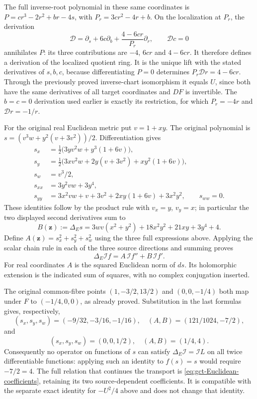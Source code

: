 The full inverse-root polynomial in these same coordinates is
$P=cr^3-2r^2+br-4s$, with $P_r=3cr^2-4r+b$.
On the localization at $P_r$, the derivation
\[
 \mathcal D=\partial_s+6c\partial_b+
                 \frac{4-6cr}{P_r}\partial_r,\qquad \mathcal D c=0
\]
annihilates $P$: its three contributions are $-4$, $6cr$ and
$4-6cr$. It therefore defines a derivation of the localized quotient
ring. It is the unique lift with the stated derivatives of $s,b,c$,
because differentiating $P=0$ determines $P_r\mathcal D r=4-6cr$.
Through the previously proved inverse-chart isomorphism it equals
$U$, since both have the same derivatives of all target coordinates
and $DF$ is invertible. The $b=c=0$ derivation used earlier is
exactly its restriction, for which $P_r=-4r$ and
$\mathcal D r=-1/r$.

For the original real Euclidean metric put $v=1+xy$. The original
polynomial is $s=(v^3w+y^2(v+3v^2))/2$. Differentiation gives
\begin{align*}
 s_x&=\tfrac12\bigl(3yv^2w+y^3(1+6v)\bigr),\\
 s_y&=\tfrac12\bigl(3xv^2w+2y(v+3v^2)+xy^2(1+6v)\bigr),\\
 s_w&=v^3/2,\\
 s_{xx}&=3y^2vw+3y^4,\\
 s_{yy}&=3x^2vw+v+3v^2+2xy(1+6v)+3x^2y^2,
 \qquad s_{ww}=0.
\end{align*}
These identities follow by the product rule with $v_x=y$, $v_y=x$;
in particular the two displayed second derivatives sum to
\[
 B(\mathbf z):=\Delta_Es
 =3wv(x^2+y^2)+18x^2y^2+21xy+3y^4+4.
\]
Define $A(\mathbf z)=s_x^2+s_y^2+s_w^2$ using the three full
expressions above. Applying the scalar chain rule in each of the
three source directions and summing proves
\begin{equation}\label{eq:gct-Euclidean-coefficients}
 \Delta_E\mathcal I f=A\,\mathcal I f''+B\,\mathcal I f'.
\end{equation}
For real coordinates $A$ is the squared Euclidean norm of $ds$.
Its holomorphic extension is the indicated sum of squares, with no
complex conjugation inserted.

The original common-fibre points
$(1,-3/2,13/2)$ and $(0,0,-1/4)$ both map under $F$ to
$(-1/4,0,0)$, as already proved. Substitution in the last formulas
gives, respectively,
\[
 (s_x,s_y,s_w)=(-9/32,-3/16,-1/16),\quad
 (A,B)=(121/1024,-7/2),
\]
and
\[
 (s_x,s_y,s_w)=(0,0,1/2),\quad (A,B)=(1/4,4).
\]
Consequently no operator on functions of $s$ can satisfy
$\Delta_E\mathcal I=\mathcal I L$ on all twice differentiable
functions: applying such an identity to $f(s)=s$ would require
$-7/2=4$. The full relation that continues the transport is
\eqref{eq:gct-Euclidean-coefficients}, retaining its two
source-dependent coefficients. It is compatible with the separate
exact identity for $-U^2/4$ above and does not change that identity.

